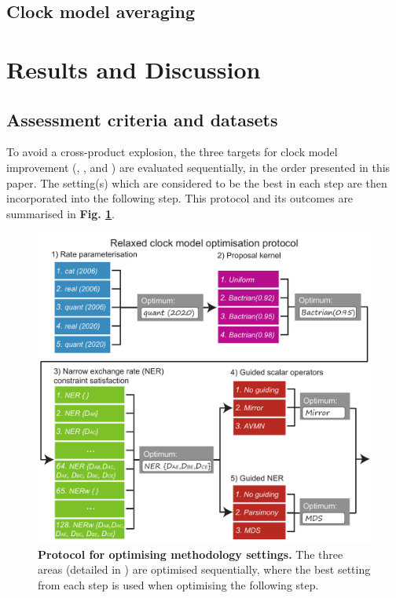 \documentclass[10pt,letterpaper]{article}
\begin{document}
\subsection*{Clock model averaging}




\section*{Results and Discussion} \label{sect:results}




\subsection*{Assessment criteria and datasets}




To avoid a cross-product explosion, the three targets for clock model improvement (\textbf{}, \textbf{}, and \textbf{}) are evaluated sequentially, in the order presented in this paper. The setting(s) which are considered to be the best in each step are then incorporated into the following step. This protocol and its outcomes are summarised in \textbf{Fig. \ref{fig:tournament}}.

\begin{figure}[!h]
\includegraphics[width=\textwidth]{Figures/tournament.pdf}
\caption{\textbf{Protocol for optimising methodology settings.} The three areas (detailed in \textbf{}) are optimised sequentially, where the best setting from each step is used when optimising the following step.}
\label{fig:tournament}
\end{figure}
\end{document}
